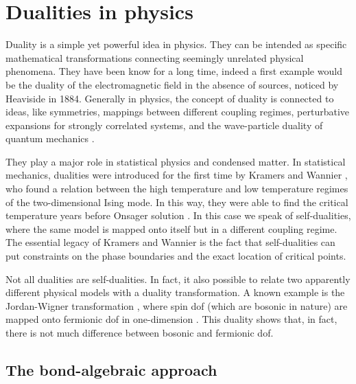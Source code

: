 \section{Dualities in physics}%
\label{sec:dualities_in_physics}


Duality is a simple yet powerful idea in physics.
They can be intended as specific mathematical transformations connecting seemingly unrelated physical phenomena.
They have been know for a long time, indeed a first example would be the duality of the electromagnetic field in the absence of sources, noticed by Heaviside in 1884.
Generally in physics, the concept of duality is connected to ideas, like symmetries, mappings between different coupling regimes, perturbative expansions for strongly correlated systems, and the wave-particle duality of quantum mechanics \cite{savit1980duality, cobanera2011bond}.

They play a major role in statistical physics and condensed matter.
In statistical mechanics, dualities were introduced for the first time by Kramers and Wannier \cite{kramers1941statistics}, who found a relation between the high temperature and low temperature regimes of the two-dimensional Ising mode.
In this way, they were able to find the critical temperature years before Onsager solution \cite{onsager1944ising}.
In this case we speak of self-dualities, where the same model is mapped onto itself but in a different coupling regime.
The essential legacy of Kramers and Wannier is the fact that self-dualities can put constraints on the phase boundaries and the exact location of critical points.

Not all dualities are self-dualities.
In fact, it also possible to relate two apparently different physical models with a duality transformation.
A known example is the Jordan-Wigner transformation \cite{schultz1964ising, jordan1928pauli}, where spin \ac{dof} (which are bosonic in nature) are mapped onto fermionic \ac{dof} in one-dimension .
This duality shows that, in fact, there is not much difference between bosonic and fermionic \ac{dof}.


%
%
\subsection{The bond-algebraic approach}
\label{sub:the_bond_algebraic_approach}

